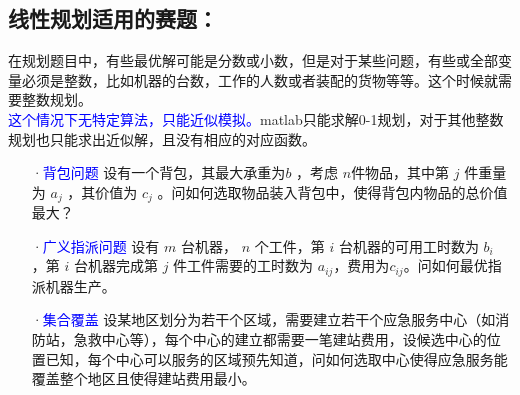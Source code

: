 \documentclass[a4paper,20pt]{article}
\begin{document}
\subsection{线性规划适用的赛题：} 
在规划题目中，有些最优解可能是分数或小数，但是对于某些问题，有些或全部变量必须是整数，比如机器的台数，工作的人数或者装配的货物等等。这个时候就需要整数规划。
\\\textcolor{blue}{这个情况下无特定算法，只能近似模拟。}matlab只能求解0-1规划，对于其他整数规划也只能求出近似解，且没有相应的对应函数。
\begin{itemize}
    \item[·\textcolor{blue}{背包问题}] 设有一个背包，其最大承重为$ b$ ，考虑 $n $件物品，其中第 $j$ 件重量为 $a_j$ ，其价值为 $c_j$ 。问如何选取物品装入背包中，使得背包内物品的总价值最大？
    \item[·\textcolor{blue}{广义指派问题}] 设有 $m$ 台机器， $n$ 个工件，第 $i$ 台机器的可用工时数为 $b_i$ ，第 $i$ 台机器完成第 $j$ 件工件需要的工时数为 $a_{ij} $，费用为$ c_{ij} $。问如何最优指派机器生产。
    \item[·\textcolor{blue}{集合覆盖}] 设某地区划分为若干个区域，需要建立若干个应急服务中心（如消防站，急救中心等），每个中心的建立都需要一笔建站费用，设候选中心的位置已知，每个中心可以服务的区域预先知道，问如何选取中心使得应急服务能覆盖整个地区且使得建站费用最小。
\end{itemize}
\end{document}
